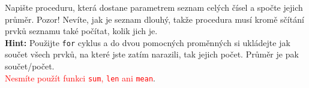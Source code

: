 \question[50]
Napište proceduru, která dostane parametrem seznam celých čísel a spočte jejich
průměr. Pozor! Nevíte, jak je seznam dlouhý, takže procedura musí kromě sčítání
prvků seznamu také počítat, kolik jich je.\\
\textbf{Hint:} Použijte \texttt{for} cyklus a do dvou pomocných proměnných si
ukládejte jak součet všech prvků, na které jste zatím narazili, tak jejich
počet. Průměr je pak součet/počet.\\
\textcolor{red}{Nesmíte použít funkci \texttt{sum}, \texttt{len} ani \texttt{mean}}.